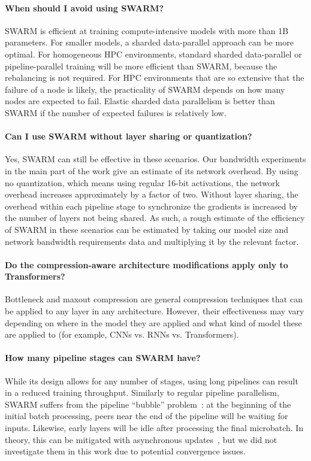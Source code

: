 \paragraph{When should I avoid using SWARM?}

SWARM is efficient at training compute-intensive models with more than 1B parameters. For smaller models, a sharded data-parallel approach can be more optimal. For homogeneous HPC environments, standard sharded data-parallel or pipeline-parallel training will be more efficient than SWARM, because the rebalancing is not required. For HPC environments that are so extensive that the failure of a node is likely, the practicality of SWARM depends on how many nodes are expected to fail. Elastic sharded data parallelism is better than SWARM if the number of expected failures is relatively low.

\paragraph{Can I use SWARM without layer sharing or quantization?}
Yes, SWARM can still be effective in these scenarios. Our bandwidth experiments in the main part of the work give an estimate of its network overhead. By using no quantization, which means using regular 16-bit activations, the network overhead increases approximately by a factor of two. Without layer sharing, the overhead within each pipeline stage to synchronize the gradients is increased by the number of layers not being shared. As such, a rough estimate of the efficiency of SWARM in these scenarios can be estimated by taking our model size and network bandwidth requirements data and multiplying it by the relevant factor.

\paragraph{Do the compression-aware architecture modifications apply only to Transformers?} 
Bottleneck and maxout compression are general compression techniques that can be applied to any layer in any architecture. However, their effectiveness may vary depending on where in the model they are applied and what kind of model these are applied to (for example, CNNs vs. RNNs vs. Transformers).

\paragraph{How many pipeline stages can SWARM have?}
While its design allows for any number of stages, using long pipelines can result in a reduced training throughput. Similarly to regular pipeline parallelism, SWARM suffers from the pipeline ``bubble'' problem~\citep{huang2019gpipe}: at the beginning of the initial batch processing, peers near the end of the pipeline will be waiting for inputs. Likewise, early layers will be idle after processing the final microbatch.
In theory, this can be mitigated with asynchronous updates~\citep{pipedream,pipemare}, but we did not investigate them in this work due to potential convergence issues.

